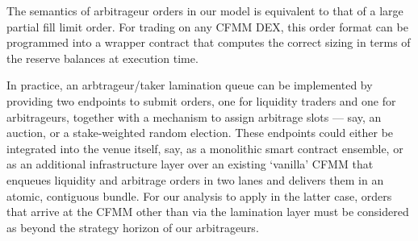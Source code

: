\begin{remark}

  The semantics of arbitrageur orders in our model is equivalent to that of a large partial fill limit order.
  For trading on any CFMM DEX, this order format can be programmed into a wrapper contract that computes the correct sizing in terms of the reserve balances at execution time.
  
  In practice, an arbtrageur/taker lamination queue can be implemented by providing two endpoints to submit orders, one for liquidity traders and one for arbitrageurs, together with a mechanism to assign arbitrage slots --- say, an auction, or a stake-weighted random election.
  These endpoints could either be integrated into the venue itself, say, as a monolithic smart contract ensemble, or as an additional infrastructure layer over an existing `vanilla' CFMM that enqueues liquidity and arbitrage orders in two lanes and delivers them in an atomic, contiguous bundle.
  For our analysis to apply in the latter case, orders that arrive at the CFMM other than via the lamination layer must be considered as beyond the strategy horizon of our arbitrageurs.
  
\end{remark}
  

